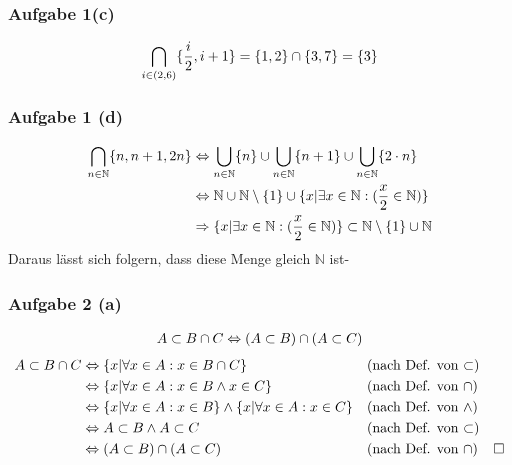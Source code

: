 \documentclass[a4paper, 10pt]{scrartcl}
\begin{document}
\subsubsection*{Aufgabe 1\small(c)}
\begin{align}
    \bigcap_{i \in (2, 6)} \{\frac{i}{2}, i + 1\} = \{1, 2\} \cap \{3, 7\} = \{3\} \notag
\end{align}

\subsubsection*{Aufgabe 1 \small(d)}
\begin{align}
    \bigcap_{n \in \mathbb{N}} \{n, n + 1, 2n\} \notag 
    &\Leftrightarrow \bigcup_{n \in \mathbb{N}} \{n\} \cup \bigcup_{n \in \mathbb{N}} \{n + 1\} \cup \bigcup_{n \in \mathbb{N}} \{2 \cdot n \} \\
    &\Leftrightarrow \mathbb{N} \cup \mathbb{N} \setminus \{1\} \cup \{x|\exists x \in \mathbb{N} : (\frac{x}{2} \in \mathbb{N})\} \notag \\
    &\Rightarrow \{x|\exists x \in \mathbb{N} : (\frac{x}{2} \in \mathbb{N})\} \subset \mathbb{N} \setminus \{1\} \cup \mathbb{N} \notag
\end{align}
Daraus lässt sich folgern, dass diese Menge gleich $\mathbb{N}$ ist-

\subsubsection*{Aufgabe 2 \small(a)}
\begin{align}
    A \subset B \cap C \Leftrightarrow (A \subset B) \cap (A \subset C) \notag
\end{align}
\begin{align}
    A \subset B \cap C &\Leftrightarrow \{x | \forall x \in A : x \in B \cap C \} && \textrm{(nach Def. von $\subset$)} \notag \\
    &\Leftrightarrow \{x | \forall x \in A : x \in B \wedge x \in C \} && \textrm{(nach Def. von $\cap$)} \notag \\
    &\Leftrightarrow \{x | \forall x \in A : x \in B \} \wedge \{x | \forall x \in A : x \in C \} && \textrm{(nach Def. von $\wedge$)} \notag \\
    &\Leftrightarrow A \subset B \wedge A \subset C && \textrm{(nach Def. von $\subset$)} \notag \\
    &\Leftrightarrow (A \subset B) \cap (A \subset C) && \textrm{(nach Def. von $\cap$)} & \Box \notag
\end{align}
\end{document}
